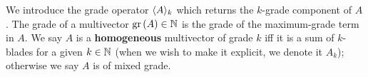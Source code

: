\begin{definition}[Grade]\label{d:grade}
	We introduce the grade operator $\langle A \rangle_{k}$ which returns the $k$-grade component of $A$.
	The grade of a multivector $\mathrm{gr}\left(A\right) \in \mathbb{N}$ is the grade of the maximum-grade term in $A$.
	We say $A$ is a \textbf{homogeneous} multivector of grade $k$ iff it is a sum of $k$-blades for a given $k \in \mathbb{N}$ (when we wish to make it explicit, we denote it $A_k$); otherwise we say $A$ is of mixed grade.
\end{definition}
